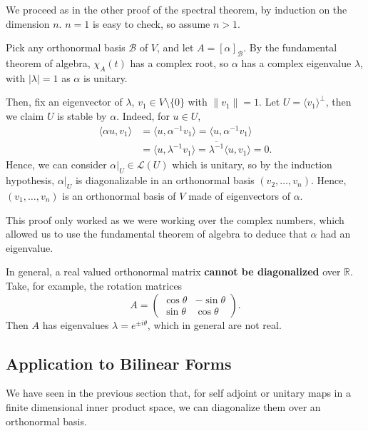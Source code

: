 \documentclass[12pt]{article}
\begin{document}
\begin{proofbox}
	We proceed as in the other proof of the spectral theorem, by induction on the dimension $n$. $n = 1$ is easy to check, so assume $n > 1$.

	Pick any orthonormal basis $\mathcal{B}$ of $V$, and let $A = [\alpha]_{\mathcal{B}}$. By the fundamental theorem of algebra, $\chi_A(t)$ has a complex root, so $\alpha$ has a complex eigenvalue $\lambda$, with $|\lambda| = 1$ as $\alpha$ is unitary.

	Then, fix an eigenvector of $\lambda$, $v_1 \in V \setminus \{0\}$ with $\|v_1\| = 1$. Let $U = \langle v_1 \rangle^{\perp}$, then we claim $U$ is stable by $\alpha$. Indeed, for $u \in U$,
	\begin{align*}
		\langle \alpha u, v_1 \rangle &= \langle u, \alpha^{-1} v_1 \rangle = \langle u, \alpha^{-1}v_1 \rangle \\
					      &= \langle u, \lambda^{-1} v_1 \rangle = \overline{\lambda^{-1}} \langle u, v_1 \rangle = 0.
	\end{align*} 
	Hence, we can consider $\alpha|_U \in \mathcal{L}(U)$ which is unitary, so by the induction hypothesis, $\alpha|_U$ is diagonalizable in an orthonormal basis $(v_2, \ldots, v_n)$. Hence, $(v_1, \ldots, v_n)$ is an orthonormal basis of $V$ made of eigenvectors of $\alpha$.
\end{proofbox}

\begin{remark}
	This proof only worked as we were working over the complex numbers, which allowed us to use the fundamental theorem of algebra to deduce that $\alpha$ had an eigenvalue.

	In general, a real valued orthonormal matrix \textbf{cannot be diagonalized} over $\mathbb{R}$. Take, for example, the rotation matrices
	\[
	A = \begin{pmatrix}
		\cos \theta & - \sin \theta \\
		\sin \theta & \cos \theta
	\end{pmatrix}
	.\]
	Then $A$ has eigenvalues $\lambda = e^{\pm i \theta}$, which in general are not real.
\end{remark}

\subsection{Application to Bilinear Forms}
\label{sub:application_to_bilinear_forms}

We have seen in the previous section that, for self adjoint or unitary maps in a finite dimensional inner product space, we can diagonalize them over an orthonormal basis.
\end{document}
